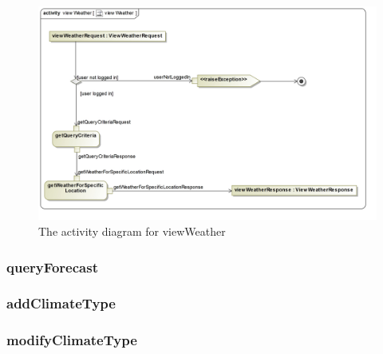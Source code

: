 \begin{figure}[H]
	\centering
	\includegraphics[width=1.0\textwidth]{../images/funcReq/viewWeatherActivityDiagram.jpg}
	\caption{The activity diagram for viewWeather \label{overflow}}
\end{figure}

\subsubsection{queryForecast}

\subsubsection{addClimateType}

\subsubsection{modifyClimateType}
